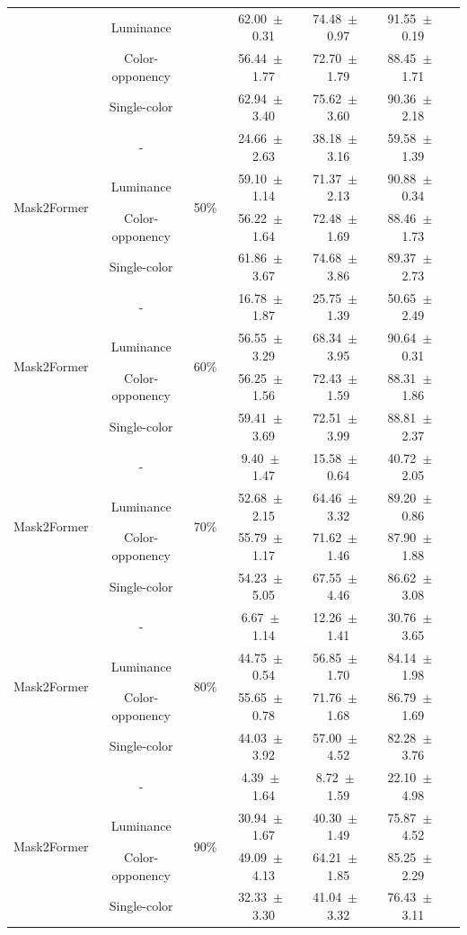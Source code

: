 \begin{table}[h]
\begin{tabular}{@{}lccc ccc@{}}
& Luminance & & 62.00~$\pm$~0.31 & 74.48~$\pm$~0.97 & 91.55~$\pm$~0.19 \\
& Color-opponency & & 56.44~$\pm$~1.77 & 72.70~$\pm$~1.79 & 88.45~$\pm$~1.71 \\
& Single-color & & 62.94~$\pm$~3.40 & 75.62~$\pm$~3.60 & 90.36~$\pm$~2.18 \\
\midrule
\multirow{4}{*}{Mask2Former} & - & \multirow{4}{*}{50\%} & 24.66~$\pm$~2.63 & 38.18~$\pm$~3.16 & 59.58~$\pm$~1.39 \\
& Luminance & & 59.10~$\pm$~1.14 & 71.37~$\pm$~2.13 & 90.88~$\pm$~0.34 \\
& Color-opponency & & 56.22~$\pm$~1.64 & 72.48~$\pm$~1.69 & 88.46~$\pm$~1.73 \\
& Single-color & & 61.86~$\pm$~3.67 & 74.68~$\pm$~3.86 & 89.37~$\pm$~2.73 \\
\midrule
\multirow{4}{*}{Mask2Former} & - & \multirow{4}{*}{60\%} & 16.78~$\pm$~1.87 & 25.75~$\pm$~1.39 & 50.65~$\pm$~2.49 \\
& Luminance & & 56.55~$\pm$~3.29 & 68.34~$\pm$~3.95 & 90.64~$\pm$~0.31 \\
& Color-opponency & & 56.25~$\pm$~1.56 & 72.43~$\pm$~1.59 & 88.31~$\pm$~1.86 \\
& Single-color & & 59.41~$\pm$~3.69 & 72.51~$\pm$~3.99 & 88.81~$\pm$~2.37 \\
\midrule
\multirow{4}{*}{Mask2Former} & - & \multirow{4}{*}{70\%} & 9.40~$\pm$~1.47 & 15.58~$\pm$~0.64 & 40.72~$\pm$~2.05 \\
& Luminance & & 52.68~$\pm$~2.15 & 64.46~$\pm$~3.32 & 89.20~$\pm$~0.86 \\
& Color-opponency & & 55.79~$\pm$~1.17 & 71.62~$\pm$~1.46 & 87.90~$\pm$~1.88 \\
& Single-color & & 54.23~$\pm$~5.05 & 67.55~$\pm$~4.46 & 86.62~$\pm$~3.08 \\
\midrule
\multirow{4}{*}{Mask2Former} & - & \multirow{4}{*}{80\%} & 6.67~$\pm$~1.14 & 12.26~$\pm$~1.41 & 30.76~$\pm$~3.65 \\
& Luminance & & 44.75~$\pm$~0.54 & 56.85~$\pm$~1.70 & 84.14~$\pm$~1.98 \\
& Color-opponency & & 55.65~$\pm$~0.78 & 71.76~$\pm$~1.68 & 86.79~$\pm$~1.69 \\
& Single-color & & 44.03~$\pm$~3.92 & 57.00~$\pm$~4.52 & 82.28~$\pm$~3.76 \\
\midrule
\multirow{4}{*}{Mask2Former} & - & \multirow{4}{*}{90\%} & 4.39~$\pm$~1.64 & 8.72~$\pm$~1.59 & 22.10~$\pm$~4.98 \\
& Luminance & & 30.94~$\pm$~1.67 & 40.30~$\pm$~1.49 & 75.87~$\pm$~4.52 \\
& Color-opponency & & 49.09~$\pm$~4.13 & 64.21~$\pm$~1.85 & 85.25~$\pm$~2.29 \\
& Single-color & & 32.33~$\pm$~3.30 & 41.04~$\pm$~3.32 & 76.43~$\pm$~3.11 \\
\midrule
\bottomrule
\end{tabular}
\label{tab:sparse_results_mask2former_acdc_fog}
\end{table}